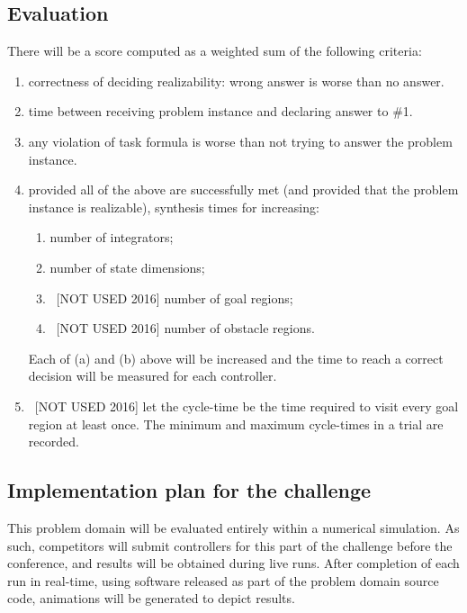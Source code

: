 \documentclass{amsart}
\theoremstyle{definition}
\begin{document}
\subsection{Evaluation}
There will be a score computed as a weighted sum of the following criteria:

\begin{enumerate}

\item correctness of deciding realizability: wrong answer is worse than no answer.

\item time between receiving problem instance and declaring answer to \#1.

\item any violation of task formula is worse than not trying to answer the
problem instance.

\item provided all of the above are successfully met (and provided that the
problem instance is realizable), synthesis times for increasing:

\begin{enumerate}
 \item number of integrators;
 \item number of state dimensions;
 \item~[NOT USED 2016] number of goal regions;
 \item~[NOT USED 2016] number of obstacle regions.
\end{enumerate}

Each of (a) and (b) above will be increased and the time to reach a
correct decision will be measured for each controller.

\item~[NOT USED 2016] let the cycle-time be the time required to visit
every goal region at least once. The minimum and maximum cycle-times in
a trial are recorded.
\end{enumerate}

\subsection{Implementation plan for the challenge}

This problem domain will be evaluated entirely within a numerical simulation.
As such, competitors will submit controllers for this part of the challenge
before the conference, and results will be obtained during live runs.
After completion of each run in real-time, using software released as part of
the problem domain source code, animations will be generated to depict results.
\end{document}
